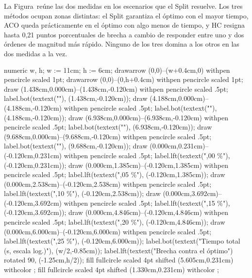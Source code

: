 \stopsubsection

\startsubsection[title={Calidad contra tiempo}]

La Figura~ reúne las dos medidas en los escenarios
que el Split resuelve. Los tres métodos ocupan zonas distintas: el Split
garantiza el óptimo con el mayor tiempo, ACO queda prácticamente en el óptimo
con algo menos de tiempo, y HC resigna hasta 0,21 puntos porcentuales de
brecha a cambio de responder entre uno y dos órdenes de magnitud más rápido.
Ninguno de los tres domina a los otros en las dos medidas a la vez.

{\startMPcode
numeric w, h; w := 11cm; h := 6cm;
drawarrow (0,0)--(w+0.4cm,0) withpen pencircle scaled 1pt;
drawarrow (0,0)--(0,h+0.4cm) withpen pencircle scaled 1pt;
draw (1.438cm,0.000cm)--(1.438cm,-0.120cm) withpen pencircle scaled .5pt;
label.bot(textext(""), (1.438cm,-0.120cm));
draw (4.188cm,0.000cm)--(4.188cm,-0.120cm) withpen pencircle scaled .5pt;
label.bot(textext(""), (4.188cm,-0.120cm));
draw (6.938cm,0.000cm)--(6.938cm,-0.120cm) withpen pencircle scaled .5pt;
label.bot(textext(""), (6.938cm,-0.120cm));
draw (9.688cm,0.000cm)--(9.688cm,-0.120cm) withpen pencircle scaled .5pt;
label.bot(textext(""), (9.688cm,-0.120cm));
draw (0.000cm,0.231cm)--(-0.120cm,0.231cm) withpen pencircle scaled .5pt;
label.lft(textext(",00 \%"), (-0.120cm,0.231cm));
draw (0.000cm,1.385cm)--(-0.120cm,1.385cm) withpen pencircle scaled .5pt;
label.lft(textext(",05 \%"), (-0.120cm,1.385cm));
draw (0.000cm,2.538cm)--(-0.120cm,2.538cm) withpen pencircle scaled .5pt;
label.lft(textext(",10 \%"), (-0.120cm,2.538cm));
draw (0.000cm,3.692cm)--(-0.120cm,3.692cm) withpen pencircle scaled .5pt;
label.lft(textext(",15 \%"), (-0.120cm,3.692cm));
draw (0.000cm,4.846cm)--(-0.120cm,4.846cm) withpen pencircle scaled .5pt;
label.lft(textext(",20 \%"), (-0.120cm,4.846cm));
draw (0.000cm,6.000cm)--(-0.120cm,6.000cm) withpen pencircle scaled .5pt;
label.lft(textext(",25 \%"), (-0.120cm,6.000cm));
label.bot(textext("Tiempo total (s, escala log.)"), (w/2,-0.85cm));
label.lft(textext("Brecha contra el óptimo") rotated 90, (-1.25cm,h/2));
fill fullcircle scaled 4pt shifted (5.605cm,0.231cm) withcolor ;
fill fullcircle scaled 4pt shifted (1.330cm,0.231cm) withcolor ;
}
